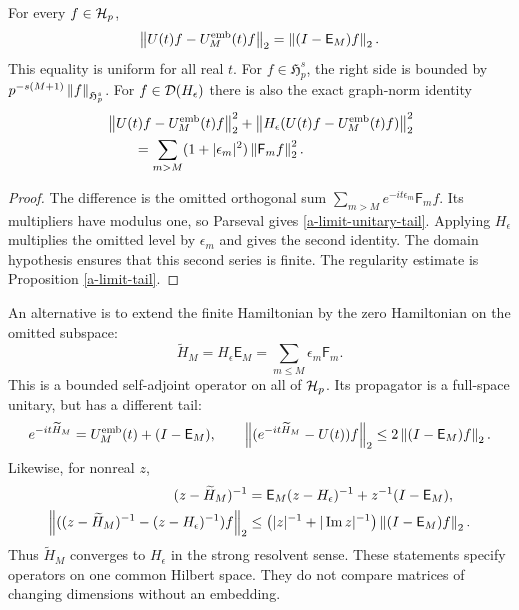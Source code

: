 \begin{proposition}
\label{a-limit-unitary-error}
For every $f\in\mathcal H_p$,
\begin{equation}
 \left\lVert U(t)f-U_M^{\mathrm{emb}}(t)f\right\rVert_2
 =\left\lVert(I-\mathsf E_M)f\right\rVert_2.
 \label{a-limit-unitary-tail}
\end{equation}
This equality is uniform for all real $t$. For
$f\in\mathfrak H_p^s$, the right side is bounded by
$p^{-s(M+1)}\left\lVert f\right\rVert_{\mathfrak H_p^s}$.
For $f\in\mathcal D(H_\epsilon)$ there is also the exact graph-norm identity
\begin{align}
 &\left\lVert U(t)f-U_M^{\mathrm{emb}}(t)f\right\rVert_2^2
 +\left\lVert H_\epsilon(U(t)f-U_M^{\mathrm{emb}}(t)f)\right\rVert_2^2
 \nonumber\\
 &\hspace{2em}=
 \sum_{m>M}(1+|\epsilon_m|^2)\left\lVert\mathsf F_mf\right\rVert_2^2.
 \label{a-limit-graph-tail}
\end{align}
\end{proposition}
\begin{proof}
The difference is the omitted orthogonal sum
$\sum_{m>M}e^{-it\epsilon_m}\mathsf F_mf$. Its multipliers have modulus
one, so Parseval gives \eqref{a-limit-unitary-tail}. Applying
$H_\epsilon$ multiplies the omitted level by $\epsilon_m$ and gives the
second identity. The domain hypothesis ensures that this second series
is finite. The regularity estimate is Proposition \ref{a-limit-tail}.
\end{proof}

An alternative is to extend the finite Hamiltonian by the zero
Hamiltonian on the omitted subspace:
\[
 \widetilde H_M=H_\epsilon\mathsf E_M
 =\sum_{m\leq M}\epsilon_m\mathsf F_m.
\]
This is a bounded self-adjoint operator on all of $\mathcal H_p$. Its
propagator is a full-space unitary, but has a different tail:
\begin{equation}
 e^{-it\widetilde H_M}
 =U_M^{\mathrm{emb}}(t)+(I-\mathsf E_M),
 \qquad
 \left\lVert(e^{-it\widetilde H_M}-U(t))f\right\rVert_2
 \leq2\left\lVert(I-\mathsf E_M)f\right\rVert_2.
 \label{a-limit-zero-hamiltonian-extension}
\end{equation}
Likewise, for nonreal $z$,
\begin{align}
 (z-\widetilde H_M)^{-1}
 &=\mathsf E_M(z-H_\epsilon)^{-1}
   +z^{-1}(I-\mathsf E_M),\nonumber\\
 \left\lVert((z-\widetilde H_M)^{-1}-(z-H_\epsilon)^{-1})f\right\rVert_2
 &\leq\left(|z|^{-1}+|\operatorname{Im}z|^{-1}\right)
 \left\lVert(I-\mathsf E_M)f\right\rVert_2.
 \label{a-limit-strong-resolvent}
\end{align}
Thus $\widetilde H_M$ converges to $H_\epsilon$ in the strong resolvent
sense. These statements specify operators on one common Hilbert space.
They do not compare matrices of changing dimensions without an embedding.

